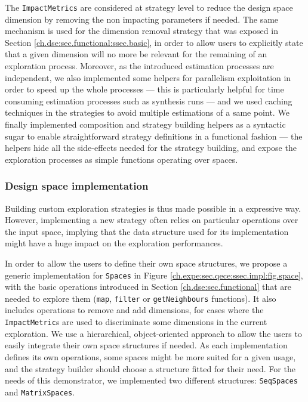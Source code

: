            The \lstinline{ImpactMetrics} are considered at strategy level to reduce the design space dimension by removing the non impacting parameters if needed.
            The same mechanism is used for the dimension removal strategy that was exposed in Section \ref{ch.dse:sec.functional:ssec.basic}, in order to allow users to explicitly state that a given dimension will no more be relevant for the remaining of an exploration process.
            Moreover, as the introduced estimation processes are independent, we also implemented some helpers for parallelism exploitation in order to speed up the whole processes --- this is particularly helpful for time consuming estimation processes such as synthesis runs --- and we used caching techniques in the strategies to avoid multiple estimations of a same point. 
            We finally implemented composition and strategy building helpers as a syntactic sugar to enable straightforward strategy definitions in a functional fashion --- \ie the helpers hide all the side-effects needed for the strategy building, and expose the exploration processes as simple functions operating over spaces.

        \vspace{-0.15cm}
        \subsubsection{Design space implementation}
        \vspace{-0.05cm}
            Building custom exploration strategies is thus made possible in a expressive way.
            However, implementing a new strategy often relies on particular operations over the input space, implying that the data structure used for its implementation might have a huge impact on the exploration performances.

            In order to allow the users to define their own space structures, we propose a generic implementation for \lstinline{Spaces} in Figure \ref{ch.expe:sec.qece:ssec.impl:fig.space}, with the basic operations introduced in Section \ref{ch.dse:sec.functional} that are needed to explore them (\eg \lstinline{map}, \lstinline{filter} or \lstinline{getNeighbours} functions).
            It also includes operations to remove and add dimensions, for cases where the \lstinline{ImpactMetric}s are used to discriminate some dimensions in the current exploration.
            We use a hierarchical, object-oriented approach to allow the users to easily integrate their own space structures if needed.
            As each implementation defines its own operations, some spaces might be more suited for a given usage, and the strategy builder should choose a structure fitted for their need.
            For the needs of this demonstrator, we implemented two different structures: \lstinline{SeqSpaces} and \lstinline{MatrixSpaces}.

